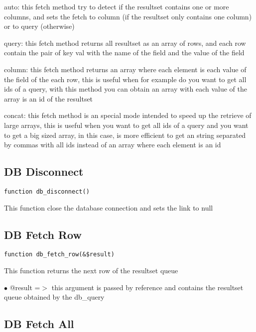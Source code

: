 \documentclass[a4paper]{book}
\begin{document}
auto: this fetch method try to detect if the resultset contains one or more columns, and
sets the fetch to column (if the resultset only contains one column) or to query (otherwise)

query: this fetch method returns all resultset as an array of rows, and each row contain the
pair of key val with the name of the field and the value of the field

column: this fetch method returns an array where each element is each value of the field of
the each row, this is useful when for example do you want to get all ids of a query, with
this method you can obtain an array with each value of the array is an id of the resultset

concat: this fetch method is an special mode intended to speed up the retrieve of large
arrays, this is useful when you want to get all ids of a query and you want to get a big
sized array, in this case, is more efficient to get an string separated by commas with all
ids instead of an array where each element is an id

\hypertarget{toc66}{}
\subsection{DB Disconnect}

\begin{lstlisting}
function db_disconnect()
\end{lstlisting}

This function close the database connection and sets the link to null

\hypertarget{toc67}{}
\subsection{DB Fetch Row}

\begin{lstlisting}
function db_fetch_row(&$result)
\end{lstlisting}

This function returns the next row of the resultset queue

\begin{compactitem}
\item[\color{myblue}$\bullet$] @result =$>$ this argument is passed by reference and contains the resultset queue
           obtained by the db\_query
\end{compactitem}

\hypertarget{toc68}{}
\subsection{DB Fetch All}
\end{document}
